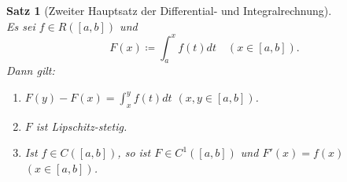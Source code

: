 \documentclass[12pt]{extreport} %
\theoremstyle{named}
\theoremstyle{itshape}
\newtheorem{satz}[unnamedtheorem]{Satz}
\theoremstyle{normal}
\begin{document}
{
\begin{satz}[Zweiter Hauptsatz der Differential- und Integralrechnung]\label{10.11:2Hauptsatz} ~\\
	Es sei $f \in R([a, b])$ und
	$$ F(x) \coloneqq \int_{a}^{x} f(t) dt \quad \left( x \in [a, b] \right). $$
	Dann gilt:
	\begin{enumerate}
		\item $F(y) - F(x) = \int_{x}^{y} f(t) dt$ $(x, y \in [a, b])$.
		\item $F$ ist Lipschitz-stetig.
		\item Ist $f \in C([a, b])$, so ist $F \in C^{1}([a, b])$ und $F'(x) = f(x)$ $(x \in[a, b])$.
	\end{enumerate}
\end{satz}

}
\end{document}
